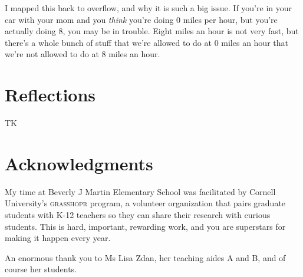 \documentclass[sigplan,review]{acmart}
\begin{document}
I mapped this back to overflow, and why it is such a big issue.
If you're in your car with your mom and you \emph{think} you're doing $0$ miles per hour, but you're actually doing $8$, you may be in trouble.
Eight miles an hour is not very fast, but there's a whole bunch of stuff that we're allowed to do at $0$ miles an hour that we're not allowed to do at $8$ miles an hour.

\section*{Reflections}

TK

\section*{Acknowledgments}

My time at Beverly J Martin Elementary School was facilitated by Cornell University's \textsc{grasshopr} program, a volunteer organization that pairs graduate students with K-12 teachers so they can share their research with curious students.
This is hard, important, rewarding work, and you are superstars for making it happen every year.

An enormous thank you to Ms Lisa Zdan, her teaching aides A and B, and of course her students.

\appendix



\end{document}
